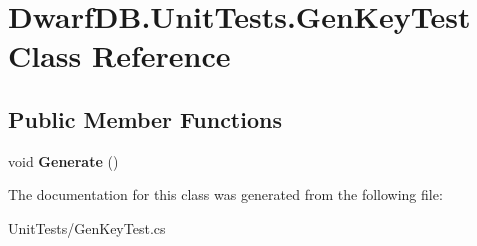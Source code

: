 \hypertarget{class_dwarf_d_b_1_1_unit_tests_1_1_gen_key_test}{
\section{DwarfDB.UnitTests.GenKeyTest Class Reference}
\label{class_dwarf_d_b_1_1_unit_tests_1_1_gen_key_test}
}
\subsection*{Public Member Functions}
\begin{DoxyCompactItemize}
\item 
\hypertarget{class_dwarf_d_b_1_1_unit_tests_1_1_gen_key_test_a0e89588b4f783127393dcc7a1d83c75c}{
void {\bfseries Generate} ()}
\label{class_dwarf_d_b_1_1_unit_tests_1_1_gen_key_test_a0e89588b4f783127393dcc7a1d83c75c}

\end{DoxyCompactItemize}


The documentation for this class was generated from the following file:\begin{DoxyCompactItemize}
\item 
UnitTests/GenKeyTest.cs\end{DoxyCompactItemize}
